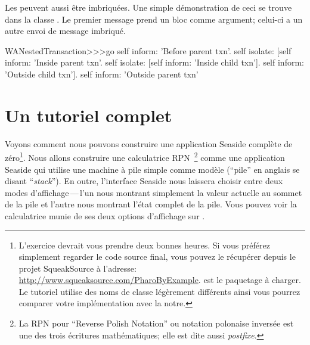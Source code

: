 \documentclass[a4paper,10pt,twoside]{book}
\begin{document}
Les \transactions{} peuvent aussi être imbriquées.
Une simple démonstration de ceci se trouve dans la classe
.
Le premier message  prend un bloc comme argument;
celui-ci a un autre envoi de message  imbriqué.

\begin{code}{}
WANestedTransaction>>>go
	self inform: 'Before parent txn'.
	self isolate:
			[self inform: 'Inside parent txn'.
			self isolate: [self inform: 'Inside child txn'].
			self inform: 'Outside child txn'].
	self inform: 'Outside parent txn'
\end{code}


\section{Un tutoriel complet}


Voyons comment nous pouvons construire une application Seaside
complète de zéro\footnote{L'exercice devrait vous prendre deux bonnes
  heures. Si vous préférez simplement regarder le code source final,
  vous pouvez le récupérer depuis le projet SqueakSource à l'adresse:
 \url{http://www.squeaksource.com/PharoByExample}. 
 est le paquetage à charger. Le tutoriel utilise des noms de classe
 légèrement différents ainsi vous pourrez comparer votre
 implémentation avec la notre.%
}.
Nous allons construire une calculatrice RPN~\footnote{La RPN pour
  ``Reverse Polish Notation'' ou notation polonaise inversée est une
  des trois écritures mathématiques; elle est dite aussi
  \emph{postfixe}.} %
comme une application Seaside qui utilise une machine à pile simple
comme modèle (``pile'' en anglais se disant ``\emph{stack}'').
En outre, l'interface Seaside nous laissera choisir entre deux modes
d'affichage\,---\,l'un nous montrant simplement la valeur
actuelle au sommet de la pile et l'autre nous montrant l'état complet
de la pile.
Vous pouvez voir la calculatrice munie de ses deux options d'affichage
sur .
\end{document}
